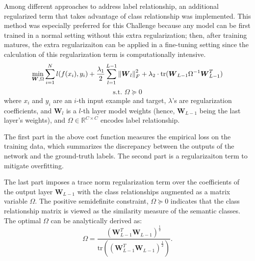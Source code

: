 \documentclass[runningheads]{llncs}
\newcommand\norm[1]{\left\lVert#1\right\rVert}
\begin{document}
Among different approaches to address label relationship, an additional regularized term that takes advantage of class relationship \cite{jiang2018} was implemented.
This method was especially preferred for this Challenge because any model can be first trained in a normal setting without this extra regularization; then, after training matures, the extra regularizaiton can be applied in a fine-tuning setting since the calculation of this regularization term is computationally intensive.
\begin{equation}
        \min_{\boldsymbol{W}, \Omega} \sum_{i=1}^{N} l(f(x_i), y_i) + \frac{\lambda_1}{2} \sum_{l=1}^{L-1} \norm{ \boldsymbol{W}_l }_F^2 + \lambda_2 \cdot \textrm{tr}( \boldsymbol{W}_{L-1} \Omega^{-1} \boldsymbol{W}_{L-1}^T) \\
\end{equation}
\[
        \textrm{s.t. } \Omega \succeq 0
\]
where $x_i$ and $y_i$ are an $i$-th input example and target, $\lambda$'s are regularization coefficients, and $\boldsymbol{W}_l$ is a $l$-th layer model weights (hence, $\boldsymbol{W}_{L-1}$ being the last layer's weights), and $\Omega \in \mathbb{R}^{C \times C}$ encodes label relationship.

The first part in the above cost function measures the empirical loss on the training data, which summarizes the discrepancy between the outputs of the network and the ground-truth labels.
The second part is a regularizaiton term to mitigate overfitting.

The last part imposes a trace norm regularization term over the coefficients of the output layer $\boldsymbol{W}_{L-1}$ with the class relationships augmented as a matrix variable $\Omega$.
The positive semidefinite constraint, $\Omega \succeq 0$ indicates that the class relationship matrix is viewed as the similarity measure of the semantic classes.
The optimal $\Omega$ can be analytically derived as:
\begin{equation}
        \Omega = \frac
        { ( \boldsymbol{W}_{L-1}^T \boldsymbol{W}_{L-1} )^\frac{1}{2}  }
        { \textrm{tr} (( \boldsymbol{W}_{L-1}^T \boldsymbol{W}_{L-1} )^\frac{1}{2} )  }.
\end{equation}

\end{document}
